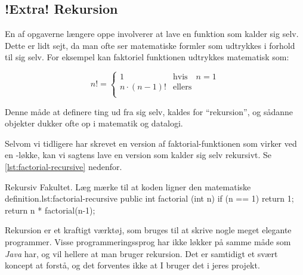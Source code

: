 	\subsection{!Extra! Rekursion}

        En af opgaverne længere  oppe
        involverer at lave en funktion som kalder sig selv. Dette er
        lidt sejt, da man ofte ser matematiske formler som udtrykkes i
        forhold til sig selv. For eksempel kan faktoriel funktionen
        udtrykkes matematisk som:

        \begin{equation}
            n! = \begin{cases}
                       1 & \text{hvis} \quad n = 1 \\
                       n\cdot(n-1)! & \text{ellers} \\
                  \end{cases}
        \end{equation}

        Denne måde at definere ting ud fra sig selv, kaldes for
        ``rekursion'', og sådanne objekter dukker ofte op i matematik
        og datalogi.


        Selvom vi tidligere har skrevet en version af
        faktorial-funktionen som virker ved en -løkke,
        kan vi sagtens lave en version som kalder sig selv rekursivt.
        Se \autoref{lst:factorial-recursive} nedenfor.

        \begin{JavaCode}{Rekursiv Fakultet. Læg mærke til at koden ligner den matematiske definition.}{lst:factorial-recursive}
            public int factorial (int n) {
                if (n == 1)   return 1;
                return n * factorial(n-1);
            }
        \end{JavaCode}

        Rekursion er et kraftigt værktøj, som bruges til at skrive
        nogle meget elegante programmer. Visse programmeringssprog har
        ikke løkker på samme måde som \emph{Java} har, og vil hellere
        at man bruger rekursion.  Det er samtidigt et svært koncept at
        forstå, og det forventes ikke at I bruger det i jeres projekt.

